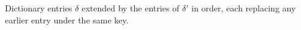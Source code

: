 Dictionary entries $\delta$ extended by the entries of $\delta'$ in order, each replacing any earlier entry under
the same key.
